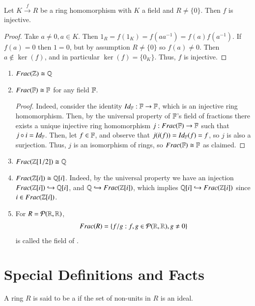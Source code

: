 \documentclass[12pt, a4paper, oneside, openright, titlepage]{book}
\begin{document}
\begin{lem}
    Let $K\xrightarrow{f} R$ be a ring homomorphism with $K$ a field and $R \neq \{0\}$. Then $f$ is injective.
    \begin{proof}
        Take $a \neq 0, a \in K$. Then $1_R = f(1_K) = f(aa^{-1}) = f(a)f(a^{-1})$. If $f(a) = 0$ then $1 = 0$, but by assumption $R \neq \{0\}$ so $f(a) \neq 0$. Then $a \notin \ker(f)$, and in particular $\ker(f) = \{0_K\}$. Thus, $f$ is injective.
    \end{proof}
\end{lem}

\begin{eg}
    \leavevmode
    \begin{enumerate}
        \item $Frac(\mathbb Z) \cong \mathbb Q$
        \item $Frac(\mathbb F) \cong \mathbb F$ for any field $\mathbb F$.
        \begin{proof}
            Indeed, consider the identity $Id_{\mathbb F}:\mathbb F\rightarrow \mathbb F$, which is an injective ring homomorphism. Then, by the universal property of $\mathbb F$'s field of fractions there exists a unique injective ring homomorphism $j:Frac(\mathbb F) \rightarrow \mathbb F$ such that $j \circ i = Id_{\mathbb F}$. Then, let $f \in \mathbb F$, and observe that $j(i(f)) = Id_{\mathbb F}(f) = f$, so $j$ is also a surjection. Thus, $j$ is an isomorphism of rings, so $Frac(\mathbb F) \cong \mathbb F$ as claimed.
        \end{proof}
        \item $Frac(\mathbb Z[1/2]) \cong \mathbb Q$
        \item $Frac(\mathbb Z[i]) \cong \mathbb Q[i]$. Indeed, by the universal property we have an injection $Frac(\mathbb Z[i])\hookrightarrow \mathbb Q[i]$, and $\mathbb Q \hookrightarrow Frac(\mathbb Z[i])$, which implies $\mathbb Q[i] \hookrightarrow Frac(\mathbb Z[i])$ since $i \in Frac(\mathbb Z[i])$.
        \item For $R = \mathcal{P}(\mathbb R,\mathbb R)$, \begin{equation}
            Frac(R) = \{f/g: f,g \in \mathcal{P}(\mathbb R,\mathbb R), g \neq 0\}
        \end{equation}
        is called the field of .
    \end{enumerate}
\end{eg}


\section{\textsection Special Definitions and Facts}

\begin{defn}
    A ring $R$ is said to be a  if the set of non-units in $R$ is an ideal.
\end{defn}
\end{document}
